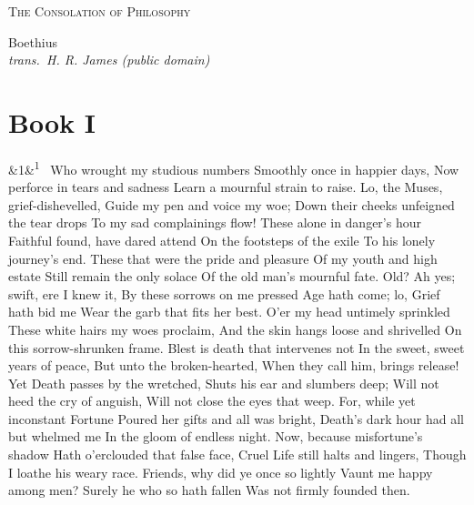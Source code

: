 \documentclass[12pt]{article}
\newcommand{\work}[1]{\begin{center}\LARGE\scshape #1\end{center}}
\newcommand{\attrib}[2]{\begin{center}\large #1\\[2pt]\small\itshape trans.\ #2\end{center}\vspace{1em}}
\newcommand{\para}[1][]{\par\noindent\ifx&#1&\else\textsuperscript{\footnotesize #1}~\fi}
\begin{document}
\work{The Consolation of Philosophy}

\attrib{Boethius}{H. R. James (public domain)}

\section*{Book I}

\para[1] Who wrought my studious numbers Smoothly once in happier days, Now perforce in tears and sadness Learn a mournful strain to raise. Lo, the Muses, grief-dishevelled, Guide my pen and voice my woe; Down their cheeks unfeigned the tear drops To my sad complainings flow! These alone in danger's hour Faithful found, have dared attend On the footsteps of the exile To his lonely journey's end. These that were the pride and pleasure Of my youth and high estate Still remain the only solace Of the old man's mournful fate. Old? Ah yes; swift, ere I knew it, By these sorrows on me pressed Age hath come; lo, Grief hath bid me Wear the garb that fits her best. O'er my head untimely sprinkled These white hairs my woes proclaim, And the skin hangs loose and shrivelled On this sorrow-shrunken frame. Blest is death that intervenes not In the sweet, sweet years of peace, But unto the broken-hearted, When they call him, brings release! Yet Death passes by the wretched, Shuts his ear and slumbers deep; Will not heed the cry of anguish, Will not close the eyes that weep. For, while yet inconstant Fortune Poured her gifts and all was bright, Death's dark hour had all but whelmed me In the gloom of endless night. Now, because misfortune's shadow Hath o'erclouded that false face, Cruel Life still halts and lingers, Though I loathe his weary race. Friends, why did ye once so lightly Vaunt me happy among men? Surely he who so hath fallen Was not firmly founded then.
\end{document}
